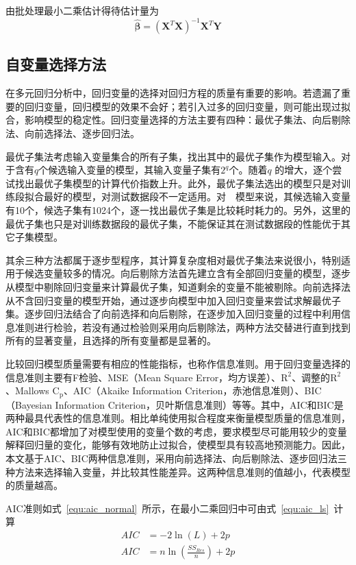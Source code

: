 由批处理最小二乘估计得待估计量为
\begin{equation}
{\bm{\hat{\beta}}}=(\bm{X}^{T}\bm{X})^{-1}\bm{X}^{T}\bm{Y}
\end{equation}

\subsection{自变量选择方法}

在多元回归分析中，回归变量的选择对回归方程的质量有重要的影响。若遗漏了重要的回归变量，回归模型的效果不会好；若引入过多的回归变量，则可能出现过拟合，影响模型的稳定性。回归变量选择的方法主要有四种：最优子集法、向后剔除法、向前选择法、逐步回归法。

最优子集法考虑输入变量集合的所有子集，找出其中的最优子集作为模型输入。对于含有$q$个候选输入变量的模型，其输入变量子集有$2^{q}$个。随着$q$ 的增大，逐个尝试找出最优子集模型的计算代价指数上升。此外，最优子集法选出的模型只是对训练段拟合最好的模型，对测试数据段不一定适用。对~~模型来说，其候选输入变量有10个，候选子集有1024个，逐一找出最优子集是比较耗时耗力的。另外，这里的最优子集也只是对训练数据段的最优子集，不能保证其在测试数据段的性能优于其它子集模型。

其余三种方法都属于逐步型程序，其计算复杂度相对最优子集法来说很小，特别适用于候选变量较多的情况。向后剔除方法首先建立含有全部回归变量的模型，逐步从模型中剔除回归变量来计算最优子集，知道剩余的变量不能被剔除。向前选择法从不含回归变量的模型开始，通过逐步向模型中加入回归变量来尝试求解最优子集。逐步回归法结合了向前选择和向后剔除，在逐步加入回归变量的过程中利用信息准则进行检验，若没有通过检验则采用向后剔除法，两种方法交替进行直到找到所有的显著变量，且选择的所有变量都是显著的\cite{montgomery2015introduction}。

比较回归模型质量需要有相应的性能指标，也称作信息准则。用于回归变量选择的信息准则主要有F检验、MSE（Mean Square Error，均方误差）、$\textrm{R}^{\textrm{2}}$、调整的$\textrm{R}^{\textrm{2}}$、Mallows $\textrm{C}_{\textrm{p}}$、AIC（Akaike Information Criterion，赤池信息准则）、BIC（Bayesian Information Criterion，贝叶斯信息准则）等等。其中，AIC和BIC是两种最具代表性的信息准则\cite{yong2005can}。相比单纯使用拟合程度来衡量模型质量的信息准则，AIC和BIC都增加了对模型使用的变量个数的考虑，要求模型尽可能用较少的变量解释回归量的变化，能够有效地防止过拟合，使模型具有较高地预测能力。因此，本文基于AIC、BIC两种信息准则，采用向前选择法、向后剔除法、逐步回归法三种方法来选择输入变量，并比较其性能差异。这两种信息准则的值越小，代表模型的质量越高。

AIC准则如式~\ref{equ:aic_normal}~所示，在最小二乘回归中可由式~\ref{equ:aic_ls}~计算
\begin{align}
AIC &= -2\ln (L) + 2p \label{equ:aic_normal}\\
AIC &= n\ln(\frac{SS_{Res}}{n})+2p \label{equ:aic_ls}
\end{align}

